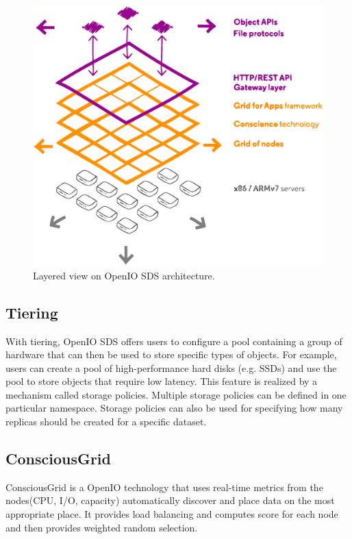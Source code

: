     \begin{figure}[hbt]
        \centering
        \includegraphics[width=1\textwidth]{obrazky-figures/openio-architecture.eps}
        \caption{Layered view on OpenIO SDS architecture.\cite{oioArch}}
        \label{fig:oioArch}
    \end{figure}


    \subsection*{Tiering}
    With tiering, OpenIO SDS offers users to configure a pool containing a group of hardware that can then be used to store specific types of objects. For example, users can create a pool of high-performance hard disks (e.g. SSDs) and use the pool to store objects that require low latency.
    This feature is realized by a mechanism called storage policies. Multiple storage policies can be defined in one particular namespace. Storage policies can also be used for specifying how many replicas should be created for a specific dataset\cite{oioCoreSolution}.

    \subsection*{ConsciousGrid}
    ConsciousGrid is a OpenIO technology that uses real-time metrics from the nodes(CPU, I/O, capacity) automatically discover and place data on the most appropriate place. It provides load balancing and computes score for each node and then provides weighted random selection\cite{oioSdsServices}.



